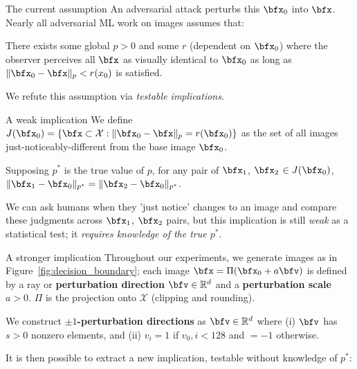 \documentclass[final,notheorems]{beamer}
\newlength{\colwidth}
\providecommand{\norm}[1]{\lVert#1\rVert}
\def\X{\mathcal X}
\def\R{\mathbb R}
\begin{document}
\begin{frame}[t]
\begin{columns}[t]
\begin{column}{\colwidth}
\begin{alertblock}{The current assumption}
    An adversarial attack perturbs this $\bfx_0$ into $\bfx$. Nearly all adversarial ML work on images assumes that:

    \hspace*{.1\linewidth}\colorbox{highlightbg}{\begin{minipage}{.8\linewidth}
      There exists some global $p>0$ and some $r$ (dependent on $\bfx_0$) where the observer perceives all $\bfx$ as visually identical to $\bfx_0$ as long as $\norm{\bfx_0-\bfx}_p < r(x_0)$ is satisfied.
    \end{minipage}}

    We refute this assumption via \emph{testable implications}.
  \end{alertblock}

  \begin{block}{A weak implication}
    We define $J(\bfx_0) = \{\bfx \subset \X : \norm{\bfx_0-\bfx}_p = r(\bfx_0)\}$ as the set of all images just-noticeably-different from the base image $\bfx_0$.

    \hspace*{.1\linewidth}\colorbox{highlightbg}{\begin{minipage}{.8\linewidth}
      Supposing $p^*$ is the true value of $p$, for any pair of $\bfx_1$, $\bfx_2$ $\in J(\bfx_0)$, $\norm{\bfx_1-\bfx_0}_{p^*} = \norm{\bfx_2-\bfx_0}_{p^*}$.
    \end{minipage}}

    We can ask humans when they 'just notice' changes to an image and compare these judgments across $\bfx_1$, $\bfx_2$ pairs, but this implication is still \emph{weak} as a statistical test; it \emph{requires knowledge of the true $p^*$}.
  \end{block}

  \begin{block}{A stronger implication}
    Throughout our experiments, we generate images as in Figure~\ref{fig:decision_boundary};
    each image $\bfx = \Pi(\bfx_0+a\bfv)$ is defined by a ray or \textbf{perturbation direction} $\bfv \in \R^d$ and a \textbf{perturbation scale} $a>0$.
    $\Pi$ is the projection onto $\X$ (clipping and rounding).

    We construct \textbf{$\pm 1$-perturbation directions} as $\bfv\in\R^d$ where
    (i) $\bfv$ has $s>0$ nonzero elements, and
    (ii) $v_i = 1$ if $v_0,i < 128$ and $=-1$ otherwise.

    It is then possible to extract a new implication, testable without knowledge of $p^*$:


\end{block}
\end{column}
\end{columns}
\end{frame}
\end{document}
